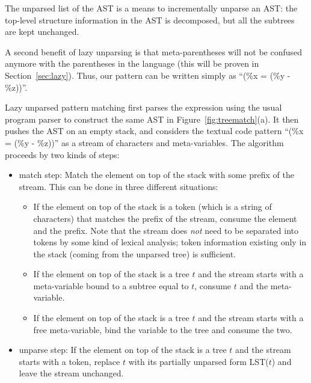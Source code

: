 \documentclass{sigplanconf}
\begin{document}
The
unparsed list of the AST is a means to incrementally unparse an AST:
the top-level structure information in the AST is decomposed, but all
the subtrees are kept unchanged.

A second benefit of lazy unparsing is that meta-parentheses will not
be confused anymore with the parentheses in the language (this will be
proven in Section~\ref{sec:lazy}). Thus, our pattern can be written
simply as ``(\%x = (\%y - \%z))''.

Lazy unparsed pattern matching first parses the expression using the
usual program parser to construct the same AST in
Figure~\ref{fig:treematch}(a). It then pushes the AST on an empty
stack, and considers the textual code pattern ``(\%x = (\%y - \%z))''
as a stream of characters and meta-variables. The algorithm proceeds
by two kinds of steps:
\begin{itemize}
\item match step: Match the element on top of the stack with some
prefix of the stream. This can be done in three different situations:
  \begin{itemize}
  \item If the element on top of the stack is a token (which is a
  string of characters) that matches the prefix of the stream, consume
  the element and the prefix. Note that the stream does {\em not} need
  to be separated into tokens by some kind of lexical analysis; token
  information existing only in the stack (coming from the unparsed
  tree) is sufficient.
  \item If the element on top of the stack is a tree $t$ and the
  stream starts with a meta-variable bound to a subtree equal to $t$,
  consume $t$ and the meta-variable.
  \item If the element on top of the stack is a tree $t$ and the
  stream starts with a free meta-variable, bind the variable to the
  tree and consume the two.
  \end{itemize}
\item unparse step: If the element on top of the stack is a tree $t$
and the stream starts with a token, replace $t$ with its partially
unparsed form LST($t$) and leave the stream unchanged.
\end{itemize}
\end{document}
